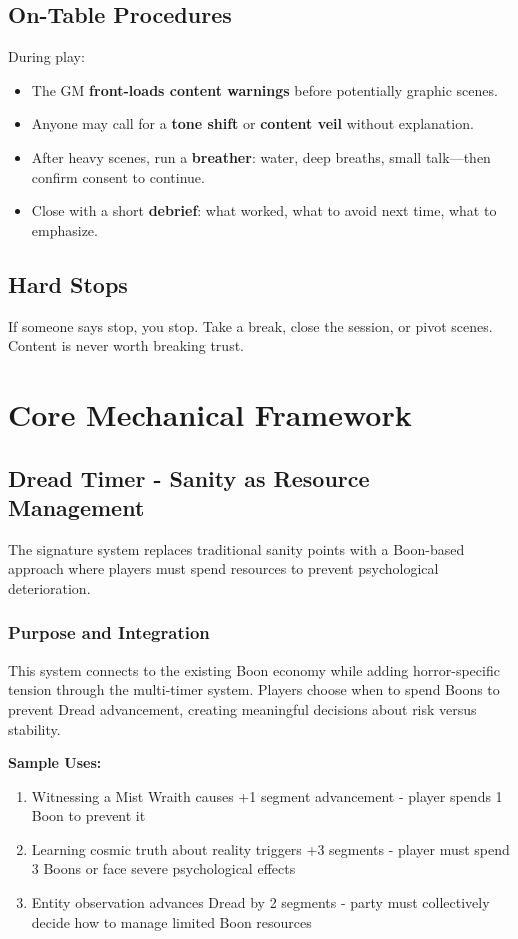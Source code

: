 \documentclass[11pt]{article}
\newenvironment{mechanic}[1]{%
  \begin{mdframed}[backgroundcolor=tableheader, linewidth=1pt, linecolor=accentcolor]%
  \subsubsection*{#1}%
}{%
  \end{mdframed}%
}
\newcommand{\GM}{\textsc{GM}}
\begin{document}
\subsection{On-Table Procedures}

During play:
\begin{itemize}
  \item The \GM{} \textbf{front-loads content warnings} before potentially graphic scenes.
  \item Anyone may call for a \textbf{tone shift} or \textbf{content veil} without explanation.
  \item After heavy scenes, run a \textbf{breather}: water, deep breaths, small talk---then confirm consent to continue.
  \item Close with a short \textbf{debrief}: what worked, what to avoid next time, what to emphasize.
\end{itemize}

\subsection{Hard Stops}

If someone says stop, you stop. Take a break, close the session, or pivot scenes. Content is never worth breaking trust.

\section{Core Mechanical Framework}

\subsection{Dread Timer - Sanity as Resource Management}

The signature system replaces traditional sanity points with a Boon-based approach where players must spend resources to prevent psychological deterioration.

\begin{mechanic}{Purpose and Integration}
This system connects to the existing Boon economy while adding horror-specific tension through the multi-timer system. Players choose when to spend Boons to prevent Dread advancement, creating meaningful decisions about risk versus stability.
\end{mechanic}

\textbf{Sample Uses:}
\begin{enumerate}
\item Witnessing a Mist Wraith causes +1 segment advancement - player spends 1 Boon to prevent it
\item Learning cosmic truth about reality triggers +3 segments - player must spend 3 Boons or face severe psychological effects
\item Entity observation advances Dread by 2 segments - party must collectively decide how to manage limited Boon resources
\end{enumerate}
\end{document}
